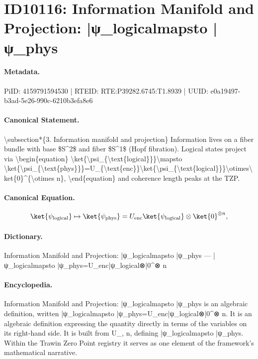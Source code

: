 \section*{ID10116: Information Manifold and Projection: |ψ\_logicalmapsto |ψ\_phys}
\paragraph{Metadata.}
PiID: 4159791594530 | RTEID: RTE:P39282.6745:T1.8939 | UUID: e0a19497-b3ad-5e26-990c-6210b3efa8e6

\paragraph{Canonical Statement.}
\textbackslash{}subsection*\{3. Information manifold and projection\} Information lives on a fiber bundle with base \$S\textasciicircum{}2\$ and fiber \$S\textasciicircum{}1\$ (Hopf fibration). Logical states project via \textbackslash{}begin\{equation\} \textbackslash{}ket\{\textbackslash{}psi\_\{\textbackslash{}text\{logical\}\}\}\textbackslash{}mapsto \textbackslash{}ket\{\textbackslash{}psi\_\{\textbackslash{}text\{phys\}\}\}=U\_\{\textbackslash{}text\{enc\}\}\textbackslash{}ket\{\textbackslash{}psi\_\{\textbackslash{}text\{logical\}\}\}\textbackslash{}otimes\textbackslash{}ket\{0\}\textasciicircum{}\{\textbackslash{}otimes n\}, \textbackslash{}end\{equation\} and coherence length peaks at the TZP.

\paragraph{Canonical Equation.}
\[
\ket{\psi_{\text{logical}}}\mapsto \ket{\psi_{\text{phys}}}=U_{\text{enc}}\ket{\psi_{\text{logical}}}\otimes\ket{0}^{\otimes n},
\]

\paragraph{Dictionary.}
Information Manifold and Projection: |ψ\_logicalmapsto |ψ\_phys — |ψ\_logicalmapsto |ψ\_phys=U\_enc|ψ\_logical⊗|0\textasciicircum{}⊗ n

\paragraph{Encyclopedia.}
Information Manifold and Projection: |ψ\_logicalmapsto |ψ\_phys is an algebraic definition, written |ψ\_logicalmapsto |ψ\_phys=U\_enc|ψ\_logical⊗|0\textasciicircum{}⊗ n. It is an algebraic definition expressing the quantity directly in terms of the variables on its right-hand side. It is built from U\_, n, defining |ψ\_logicalmapsto |ψ\_phys. Within the Trawin Zero Point registry it serves as one element of the framework's mathematical narrative.
